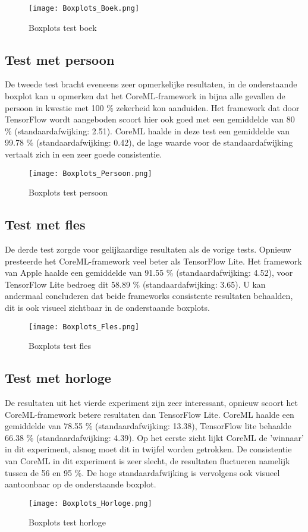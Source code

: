 \begin{figure}[H]
	\centering
	\texttt{[image: Boxplots\_Boek.png]}
	\caption{Boxplots test boek}
\end{figure}
\subsection{Test met persoon}

De tweede test bracht eveneens zeer opmerkelijke resultaten, in de onderstaande boxplot kan u opmerken dat het CoreML-framework in bijna alle gevallen de persoon in kwestie met 100 \% zekerheid kon aanduiden. Het framework dat door TensorFlow wordt aangeboden scoort hier ook goed met een gemiddelde van 80 \% (standaardafwijking: 2.51). CoreML haalde in deze test een gemiddelde van 99.78 \% (standaardafwijking: 0.42), de lage waarde voor de standaardafwijking vertaalt zich in een zeer goede consistentie.
\begin{figure}[H]
	\centering
	\texttt{[image: Boxplots\_Persoon.png]}
	\caption{Boxplots test persoon}
\end{figure}

\subsection{Test met fles}
De derde test zorgde voor gelijkaardige resultaten als de vorige tests. Opnieuw presteerde het CoreML-framework veel beter als TensorFlow Lite. Het framework van Apple haalde een gemiddelde van 91.55 \% (standaardafwijking: 4.52), voor TensorFlow Lite bedroeg dit 58.89 \% (standaardafwijking: 3.65). U kan andermaal concluderen dat beide frameworks consistente resultaten behaalden, dit is ook visueel zichtbaar in de onderstaande boxplots. 
\begin{figure}[H]
	\centering
	\texttt{[image: Boxplots\_Fles.png]}
	\caption{Boxplots test fles}
\end{figure}
\subsection{Test met horloge}
De resultaten uit het vierde experiment zijn zeer interessant, opnieuw scoort het CoreML-framework betere resultaten dan TensorFlow Lite. CoreML haalde een gemiddelde van 78.55 \% (standaardafwijking: 13.38), TensorFlow lite behaalde 66.38 \% (standaardafwijking: 4.39). Op het eerste zicht lijkt CoreML de 'winnaar' in dit experiment, alsnog moet dit in twijfel worden getrokken. De consistentie van CoreML in dit experiment is zeer slecht, de resultaten fluctueren namelijk tussen de  56 en 95 \%. De hoge standaardafwijking is vervolgens ook visueel aantoonbaar op de onderstaande boxplot.
\begin{figure}[H]
	\centering
	\texttt{[image: Boxplots\_Horloge.png]}
	\caption{Boxplots test horloge}
\end{figure}

